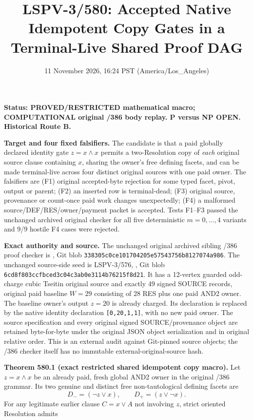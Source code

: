 \documentclass[11pt]{article}
\title{LSPV-3/580: Accepted Native Idempotent Copy Gates in a Terminal-Live Shared Proof DAG}
\date{11 November 2026, 16:24 PST (America/Los\_Angeles)}
\begin{document}
\maketitle
\noindent\textbf{Status: PROVED/RESTRICTED mathematical macro; COMPUTATIONAL original /386 body replay. P versus NP OPEN. Historical Route B.}
\par
\textbf{Target and four fixed falsifiers.} The candidate is that a paid globally declared identity gate $z=x\land x$ permits a two-Resolution copy of \emph{each} original source clause containing $x$, sharing the owner's free defining facets, and can be made terminal-live across four distinct original sources with one paid owner. The falsifiers are (F1) original accepted-byte rejection for some typed facet, pivot, output or parent; (F2) an inserted row is terminal-dead; (F3) original source, provenance or count-once paid work changes unexpectedly; (F4) a malformed source/DEF/RES/owner/payment packet is accepted. Tests F1--F3 passed the unchanged archived original checker for all five deterministic $m=0,\ldots,4$ variants and 9/9 hostile F4 cases were rejected.
\par
\textbf{Exact authority and source.} The unchanged original archived sibling /386 proof checker is , Git blob \texttt{338305c0ce101704205e57543756b8127074a986}. The unchanged source-side seed is LSPV-3/576, , Git blob \texttt{6cd8f803ccfbced3c04c3ab0e3114b76215f8d21}. It has a 12-vertex guarded odd-charge cubic Tseitin original source and exactly 49 signed SOURCE records, original paid baseline $W=29$ consisting of 28 RES plus one paid AND2 owner. The baseline owner's output $z=20$ is already charged. Its declaration is replaced by the native identity declaration \texttt{[0,20,1,1]}, with no new paid owner. The source specification and every original signed SOURCE/provenance object are retained byte-for-byte under the original JSON object serialization and in original relative order. This is an external audit against Git-pinned source objects; the /386 checker itself has no immutable external-original-source hash.
\par
\textbf{Theorem 580.1 (exact restricted shared idempotent copy macro).}
Let $z=x\wedge x$ be an already paid, fresh global AND2 owner in the original /386 grammar. Its two genuine and distinct free non-tautological defining facets are
\[
D_-=(\neg z\vee x),\qquad D_+=(z\vee\neg x).
\]
For any legitimate earlier clause $C=x\vee A$ not involving $z$, strict oriented Resolution admits
\end{document}
